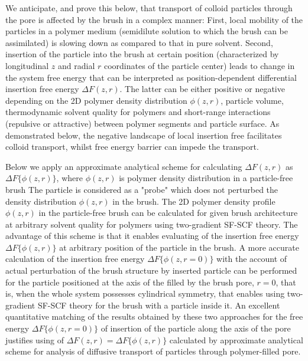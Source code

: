 \documentclass[12pt, a4paper]{article}
\begin{document}
We anticipate, and prove this below, that transport of colloid particles through the pore is affected by the brush in a complex manner: First, local mobility of the particles in a polymer medium
(semidilute solution to which the brush can be assimilated) is slowing down  as compared to that in pure solvent. Second, insertion of the particle into the brush at certain position
(characterized by longitudinal $z$ and radial $r$ coordinates of the particle center) leads to change in the system free energy that can be interpreted as position-dependent differential insertion free energy $\Delta F(z,r)$. 
The latter can be either positive or negative depending on the 2D polymer density distribution $\phi(z,r)$, particle volume, 
thermodynamic solvent quality for polymers and short-range interactions (repulsive or attractive) between polymer segments and particle surface. 
As demonstrated below, the negative landscape of local insertion free facilitates colloid transport, whilst free energy barrier can impede the transport.

Below we apply an approximate analytical scheme for calculating $\Delta F(z,r)$ as $\Delta F\{\phi(z,r)\}$, where $\phi(z,r)$ is polymer density distribution in a particle-free brush
The particle is considered as a "probe" which does not perturbed the density distribution $\phi(z,r)$ in the brush. 
The 2D polymer density profile $\phi(z,r)$ in the particle-free brush can be calculated for given brush architecture at arbitrary solvent quality for polymers using two-gradient SF-SCF theory.
The advantage of this scheme is that it enables evaluating of the insertion free energy $\Delta F\{\phi(z,r)\}$ at arbitrary position of the particle in the brush.
A more accurate calculation of the insertion free energy $\Delta F\{\phi(z,r=0)\}$ with the account of actual perturbation of the brush structure by inserted particle can be performed 
for the particle positioned at the axis of the filled by the brush pore, $r=0$, that is, when the whole system possesses cylindrical symmetry, 
that enables using two-gradient SF-SCF theory for the brush with a particle inside it. An excellent quantitative matching of the results obtained by these two approaches for the free energy $\Delta F\{\phi(z,r=0)\}$
of insertion of the particle along the axis of the pore justifies using of $\Delta F(z,r)=\Delta F\{\phi(z,r)\}$ calculated by approximate analytical scheme for analysis of diffusive transport of particles 
through polymer-filled pore. 

 

\end{document}
